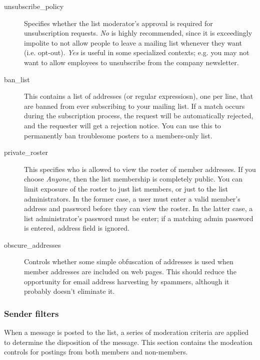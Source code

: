\documentclass{howto}
\begin{document}
\begin{description}
\begin{itemize}
    \end{itemize}

\item[unsubscribe_policy]
    Specifies whether the list moderator's approval is required for
    unsubscription requests.  \emph{No} is highly recommended, since
    it is exceedingly impolite to not allow people to leave a mailing
    list whenever they want (i.e. opt-out).  \emph{Yes} is useful in
    some specialized contexts; e.g. you may not want to allow
    employees to unsubscribe from the company newsletter.

\item[ban_list]
    This contains a list of addresses (or regular expressiosn), one
    per line, that are banned from ever subscribing to your mailing
    list.  If a match occurs during the subscription process, the
    request will be automatically rejected, and the requester will get
    a rejection notice.  You can use this to permanently ban
    troublesome posters to a members-only list.

\item[private_roster]
    This specifies who is allowed to view the roster of member
    addresses.  If you choose \emph{Anyone}, then the list membership
    is completely public.  You can limit exposure of the roster to
    just list members, or just to the list administrators.  In the
    former case, a user must enter a valid member's address and
    password before they can view the roster.  In the latter case, a
    list administrator's password must be enter; if a matching admin
    password is entered, address field is ignored.

\item[obscure_addresses]
    Controls whether some simple obfuscation of addresses is used when
    member addresses are included on web pages.  This should reduce
    the opportunity for email address harvesting by spammers, although
    it probably doesn't eliminate it.
\end{description}

\subsubsection{Sender filters}

When a message is posted to the list, a series of moderation criteria are
applied to determine the disposition of the message.  This section
contains the modeation controls for postings from both members and
non-members.
\end{document}
